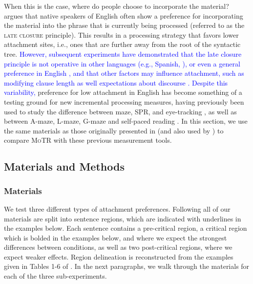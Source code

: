 \documentclass[12pt]{article}
\newcommand{\motr}{\textsc{MoTR}\xspace}
\newcommand{\defn}[1]{\textsc{#1}}
\newcommand{\change}[1]{\textcolor{blue}{#1}}
\begin{document}
{When this is the case, where do people choose to incorporate the material? \cite{frazier1979comprehending} argues that native speakers of English often show a preference for incorporating the material into the phrase that is currently being processed (referred to as the \defn{late closure} principle). This results in a processing strategy that favors lower attachment sites, i.e., ones that are further away from the root of the syntactic tree. \change{However, subsequent experiments have demonstrated that the late closure principle is not operative in other languages (e.g., Spanish, \citealp{cuetos1988cross}), or even a general preference in English \citep{gilboy1995argument}, and that other factors may influence attachment, such as modifying clause length \citep{hemforth2015relative} as well expectations about discourse \citep{rohde2011anticipating}. Despite this variability,} preference for low attachment in English has become something of a testing ground for new incremental processing measures, having previously been used to study the difference between maze, SPR, and eye-tracking \citep{witzel2012maze}, as well as between A-maze, L-maze, G-maze and self-paced reading \citep{boyce2020amaze}. In this section, we use the same materials as those originally presented in \cite{witzel2012maze} (and also used by \citealp{boyce2020amaze}) to compare \motr with these previous measurement tools.

\subsection{Materials and Methods}

\subsubsection{Materials}


We test three different types of attachment preferences. Following \cite{witzel2012maze} all of our materials are split into sentence regions, which are indicated with underlines in the examples below. Each sentence contains a pre-critical region, a critical region which is bolded in the examples below, and where we expect the strongest differences between conditions, as well as two post-critical regions, where we expect weaker effects. Region delineation is reconstructed from the examples given in Tables 1-6 of \cite{witzel2012maze}. In the next paragraphs, we walk through the materials for each of the three sub-experiments.

}
\end{document}
